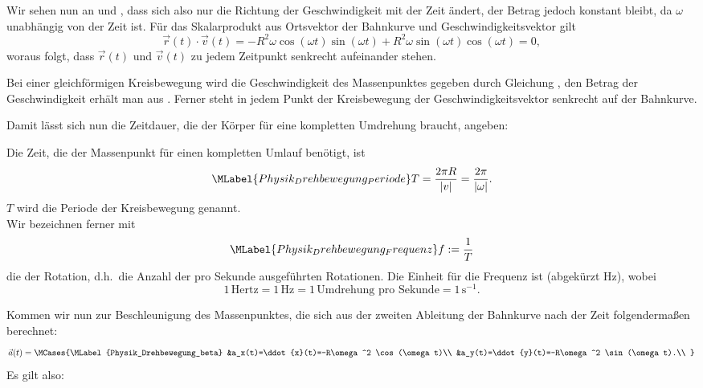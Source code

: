 \begin{MContent}
        Wir sehen nun an  und , dass sich also nur die Richtung der Geschwindigkeit mit der Zeit \"andert, der Betrag jedoch konstant bleibt, da $\omega$ unabh\"angig von der Zeit ist. F\"ur das Skalarprodukt aus Ortsvektor der Bahnkurve und Geschwindigkeitsvektor gilt
        \begin{equation*}
        \vec{r}(t)\cdot\vec{v}(t)=-R^2\omega\cos(\omega t)\sin(\omega t)+ R^2\omega\sin(\omega t)\cos(\omega t)=0,
        \end{equation*} 
        woraus folgt, dass $\vec{r}(t)$ und $\vec{v}(t)$ zu jedem Zeitpunkt senkrecht aufeinander stehen.
        \begin{MInfo}
        Bei einer gleichf\"ormigen Kreisbewegung wird die Geschwindigkeit des Massenpunktes gegeben durch Gleichung , den Betrag der Geschwindigkeit erh\"alt man aus . Ferner steht in jedem Punkt der Kreisbewegung der Geschwindigkeitsvektor senkrecht auf der Bahnkurve.
        \end{MInfo}
        
        Damit l\"asst sich nun die Zeitdauer, die der K\"orper f\"ur eine kompletten Umdrehung braucht, angeben:
          \begin{MInfo}
          Die Zeit, die der Massenpunkt f\"ur einen kompletten Umlauf ben\"otigt, ist
          \begin{equation}\MLabel{Physik_Drehbewegung_Periode}
          T=\frac{2\pi R}{\vert v\vert}=\frac{2\pi}{\vert\omega\vert}.
          \end{equation} $T$ wird die Periode der Kreisbewegung genannt.\\
          Wir bezeichnen ferner mit
          \begin{equation}\MLabel{Physik_Drehbewegung_Frequenz}
          f:=\frac{1}{T}
          \end{equation} die  der Rotation, d.h.~die Anzahl der pro Sekunde ausgef\"uhrten Rotationen. Die Einheit f\"ur die Frequenz ist  (abgek\"urzt Hz), wobei 
          \begin{equation*}
          1\,\text{Hertz}=1\,\text{Hz}=1\,\text{Umdrehung pro Sekunde}=1\,\text{s}^{-1}.
          \end{equation*}
          \end{MInfo}
          
          
         Kommen wir nun zur Beschleunigung des Massenpunktes, die sich aus der zweiten Ableitung der Bahnkurve nach der Zeit folgenderma{\ss}en berechnet:
             \begin{equation}
             \vec{a}(t)=\MCases{\MLabel{Physik_Drehbewegung_beta}
                 &a_x(t)=\ddot{x}(t)=-R\omega^2 \cos(\omega t)\\
                 &a_y(t)=\ddot{y}(t)=-R\omega^2 \sin(\omega t).\\
                 }
             \end{equation}
             Es gilt also:
             

\end{MContent}
